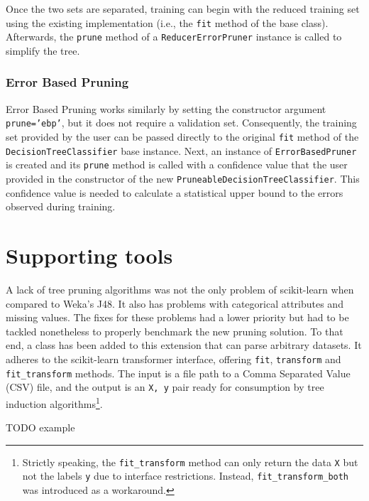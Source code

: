 Once the two sets are separated, training can begin with the reduced training set using the existing implementation (i.e., the \texttt{fit} method of the base class). Afterwards, the \texttt{prune} method of a \texttt{ReducerErrorPruner} instance is called to simplify the tree.

\subsubsection{Error Based Pruning}
Error Based Pruning works similarly by setting the constructor argument \texttt{prune='ebp'}, but it does not require a validation set. Consequently, the training set provided by the user can be passed directly to the original \texttt{fit} method of the \texttt{DecisionTreeClassifier} base instance. Next, an instance of \texttt{ErrorBasedPruner} is created and its \texttt{prune} method is called with a confidence value that the user provided in the constructor of the new \texttt{PruneableDecisionTreeClassifier}. This confidence value is needed to calculate a statistical upper bound to the errors observed during training.



\section{Supporting tools}
A lack of tree pruning algorithms was not the only problem of scikit-learn when compared to Weka's J48. It also has problems with categorical attributes and missing values. The fixes for these problems had a lower priority but had to be tackled nonetheless to properly benchmark the new pruning solution. To that end, a  class has been added to this extension that can parse arbitrary datasets. It adheres to the scikit-learn transformer interface, offering \texttt{fit}, \texttt{transform} and \texttt{fit\_transform} methods. The input is a file path to a Comma Separated Value (CSV) file, and the output is an \texttt{X, y} pair ready for consumption by tree induction algorithms\footnote{Strictly speaking, the \texttt{fit\_transform} method can only return the data \texttt{X} but not the labels \texttt{y} due to interface restrictions. Instead, \texttt{fit\_transform\_both} was introduced as a workaround.}.

TODO example

